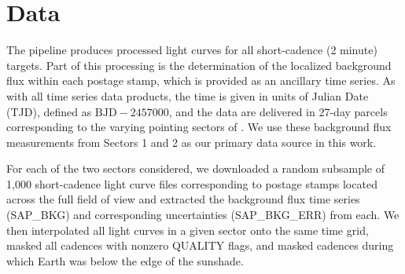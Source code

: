 \documentclass[modern]{aastex62}
\begin{document}
\section{Data}
\label{sec:data}

The \TESS pipeline produces processed light curves for all short-cadence (2 minute) targets. 
Part of this processing is the determination of the localized background flux 
within each postage stamp, which is provided as an ancillary time series. 
As with all \TESS time series data products, the time is given in units of \TESS Julian 
Date (TJD), defined as $\mathrm{BJD} - 2457000$, and the data are delivered in 27-day 
parcels corresponding to the varying pointing sectors of \TESS. 
We use these background flux measurements from Sectors 1 and 2 as our primary 
data source in this work. 

For each of the two sectors considered, we downloaded a random subsample of 
1,000 short-cadence light curve files corresponding to postage stamps located 
across the full \TESS field of view and extracted the background flux time 
series (\textsf{SAP\_BKG}) and corresponding uncertainties
(\textsf{SAP\_BKG\_ERR}) from each. 
We then interpolated all light curves in a given sector onto the same time
grid, masked all cadences with nonzero \textsf{QUALITY} flags, and masked
cadences during which Earth was below the edge of the sunshade.
\end{document}
